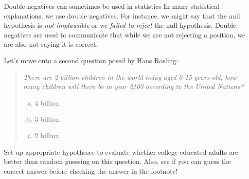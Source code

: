 \begin{onebox}{Double negatives can sometimes be used in statistics}
  In many statistical explanations, we use double negatives.
  For instance, we might say that the null hypothesis is
  \emph{not implausible} or we \emph{failed to reject}
  the null hypothesis.
  Double negatives are used to communicate that while we
  are not rejecting a position, we are also not saying it
  is correct.
\end{onebox}

\begin{exercisewrap}
\begin{nexercise}\label{roslingB_hypothesis_setup}
Let's move onto a second question posed by Hans Rosling:
\begin{quote}{\em
  There are 2 billion children in the world today
  aged 0-15 years old, how many children will there
  be in year 2100 according to the United Nations?
  \begin{enumerate}[a.]
  \item 4 billion.
  \item 3 billion.
  \item 2 billion.
  \end{enumerate}
}\end{quote}
Set up appropriate hypotheses to evaluate whether
college-educated adults are better than random guessing
on this question.
Also, see if you can guess the correct answer before checking
the answer in the footnote!\footnotemark
\end{nexercise}
\end{exercisewrap}

\newcommand{\roslingBsize}{228}
\newcommand{\roslingBprop}{0.149}
\newcommand{\roslingBpropcomplement}{0.851}
\newcommand{\roslingBpercent}{14.9}
\newcommand{\roslingBpercentcomplement}{85.1}
\newcommand{\roslingBcount}{34}
\newcommand{\roslingBcountcomplement}{194}
\newcommand{\roslingBse}{0.024}

